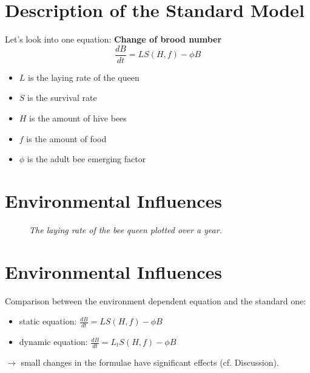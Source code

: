 \documentclass[
	paper=128mm:96mm,
	fontsize=11pt,
	pagesize,
	parskip=half-,
]{scrartcl}
\theoremstyle{mythmstyle} %
\begin{document}
\section*{Description of the Standard Model}
	Let's look into one equation: \textbf{Change of brood number}
	\begin{equation}\label{eq:changeBroodNumbers}
			\frac{dB}{dt} = LS(H,f)-\phi B
	\end{equation}
	\begin{itemize}
	\item $L$ is the laying rate of the queen
	\item $S$ is the survival rate
	\item $H$ is the amount of hive bees
	\item $f$ is the amount of food
	\item $\phi$ is the adult bee emerging factor
	\end{itemize}
	
	\clearpage
\section{Environmental Influences}
	\begin{figure}[H]
		\centering
		\caption{\textit{The laying rate of the bee queen plotted over a year.}}
	\end{figure}
	\clearpage
\section*{Environmental Influences}
	Comparison between the environment dependent equation and the standard one: 
	\begin{itemize}
		\item static equation: $	\frac{dB}{dt} = LS(H,f)-\phi B $
		\item dynamic equation: $\frac{dB}{dt} = L_tS(H,f)-\phi B$
	\end{itemize}
	$\longrightarrow$ small changes in the formulae have significant effects (cf. Discussion).
	\clearpage
\end{document}
